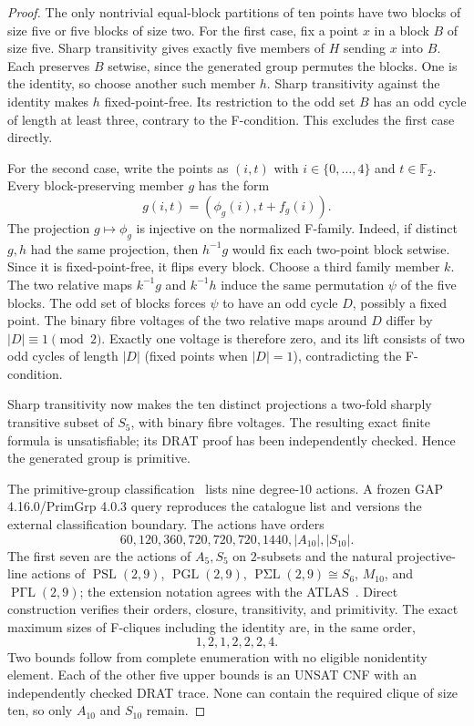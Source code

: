 \begin{proof}
The only nontrivial equal-block partitions of ten points have two blocks of
size five or five blocks of size two. For the first case, fix a point $x$
in a block $B$ of size five. Sharp transitivity gives exactly five members
of $H$ sending $x$ into $B$. Each preserves $B$ setwise, since the generated
group permutes the blocks. One is the identity, so choose another such
member $h$. Sharp transitivity against the identity makes $h$ fixed-point-free.
Its restriction to the odd set $B$ has an odd cycle of length at least three,
contrary to the F-condition. This excludes the first case directly.

For the second case, write the points as $(i,t)$ with $i\in\{0,\ldots,4\}$
and $t\in\mathbb F_2$.  Every block-preserving member $g$ has the form
\[
 g(i,t)=(\phi_g(i),t+f_g(i)).
\]
The projection $g\mapsto\phi_g$ is injective on the normalized F-family.
Indeed, if distinct $g,h$ had the same projection, then $h^{-1}g$ would fix
each two-point block setwise.  Since it is fixed-point-free, it flips every
block.  Choose a third family member $k$.  The two relative maps
$k^{-1}g$ and $k^{-1}h$ induce the same permutation $\psi$ of the five
blocks.  The odd set of blocks forces $\psi$ to have an odd cycle $D$,
possibly a fixed point.  The binary fibre voltages of the two relative maps
around $D$ differ by $|D|\equiv1\pmod2$.  Exactly one voltage is therefore
zero, and its lift consists of two odd cycles of length $|D|$ (fixed points
when $|D|=1$), contradicting the F-condition.

Sharp transitivity now makes the ten distinct projections a two-fold sharply
transitive subset of $S_5$, with binary fibre voltages.  The resulting exact
finite formula is unsatisfiable; its DRAT proof has been independently
checked.  Hence the generated group is primitive.

The primitive-group classification~\cite{BuekenhoutLeemans1996,GAPPrimGrp}
lists nine degree-$10$ actions.  A frozen GAP 4.16.0/PrimGrp 4.0.3 query
reproduces the catalogue list and versions the external classification
boundary.  The actions have orders
\[
  60,120,360,720,720,720,1440,|A_{10}|,|S_{10}|.
\]
The first seven are the actions of $A_5,S_5$ on $2$-subsets and the natural
projective-line actions of
$\operatorname{PSL}(2,9)$, $\operatorname{PGL}(2,9)$,
$\operatorname{P\Sigma L}(2,9)\cong S_6$, $M_{10}$, and
$\operatorname{P\Gamma L}(2,9)$; the extension notation agrees with the
ATLAS~\cite{AtlasA6}.  Direct construction verifies their orders, closure,
transitivity, and primitivity.  The exact maximum sizes of F-cliques including
the identity are, in the same order,
\[
  1,2,1,2,2,2,4.
\]
Two bounds follow from complete enumeration with no eligible nonidentity
element.  Each of the other five upper bounds is an UNSAT CNF with an
independently checked DRAT trace.  None can contain the required clique of
size ten, so only $A_{10}$ and $S_{10}$ remain.
\end{proof}

